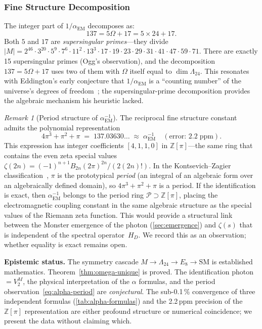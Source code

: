 \documentclass[11pt,a4paper]{article}
\theoremstyle{plain}
\theoremstyle{remark}
\newtheorem{remark}[theorem]{Remark}
\renewcommand{\Omega}{\varOmega}
\newcommand{\Z}{\mathbb{Z}}
\begin{document}
\subsubsection{Fine Structure Decomposition}

The integer part of $1/\alpha_{\mathrm{EM}}$ decomposes as:
\[
  137 = 5\Omega + 17 = 5\times 24 + 17.
\]
Both $5$ and $17$ are \emph{supersingular primes}---they divide
$|M| = 2^{46}\cdot 3^{20}\cdot 5^9\cdot 7^6\cdot 11^2\cdot 13^3
\cdot 17\cdot 19\cdot 23\cdot 29\cdot 31\cdot 41\cdot 47\cdot 59\cdot 71$.
There are exactly 15 supersingular primes (Ogg's observation), and
the decomposition $137 = 5\Omega + 17$ uses two of them with $\Omega$
itself equal to $\dim\Lambda_{24}$.
This resonates with Eddington's early conjecture that $1/\alpha_{\mathrm{EM}}$
is a ``counting number'' of the universe's degrees of
freedom~\cite{eddington1936}; the supersingular-prime decomposition
provides the algebraic mechanism his heuristic lacked.

\begin{remark}[Period structure of $\alpha_{\mathrm{EM}}^{-1}$]
\label{rem:alpha-period}
The reciprocal fine structure constant admits the polynomial
representation
\begin{equation}\label{eq:alpha-period}
  4\pi^3 + \pi^2 + \pi \;=\; 137.03630\ldots
  \;\approx\; \alpha_{\mathrm{EM}}^{-1}
  \quad(\text{error: }2.2\;\mathrm{ppm}).
\end{equation}
This expression has integer coefficients $[4,1,1,0]$ in
$\Z[\pi]$---the same ring that contains the even zeta special values
$\zeta(2n) = (-1)^{n+1}B_{2n}(2\pi)^{2n}/(2(2n)!)$.  In the
Kontsevich--Zagier classification~\cite{kontsevich-zagier2001},
$\pi$ is the prototypical \emph{period} (an integral of an algebraic
form over an algebraically defined domain), so $4\pi^3+\pi^2+\pi$
is a period.  If the identification is exact, then
$\alpha_{\mathrm{EM}}^{-1}$ belongs to the period ring
$\mathcal{P}\supset\Z[\pi]$, placing the electromagnetic coupling
constant in the same algebraic structure as the special values of the
Riemann zeta function.  This would provide a structural link between
the Monster emergence of the photon (\cref{sec:emergence}) and $\zeta(s)$
that is independent of the spectral operator~$H_D$.
We record this as an observation; whether equality is exact remains open.
\end{remark}

\medskip
\noindent\textbf{Epistemic status.}\quad
The symmetry cascade $M\to\Lambda_{24}\to E_8\to\mathrm{SM}$ is
established mathematics.  Theorem~\ref{thm:omega-unique} is proved.
The identification photon $= V_2^M$, the physical interpretation
of the $\alpha$ formulas, and the period
observation~\eqref{eq:alpha-period} are \emph{conjectural}.
The sub-0.1\,\% convergence of three independent formulas
(\cref{tab:alpha-formulas}) and the 2.2\,ppm precision of the
$\Z[\pi]$ representation are either profound structure or numerical
coincidence; we present the data without claiming which.
\end{document}
